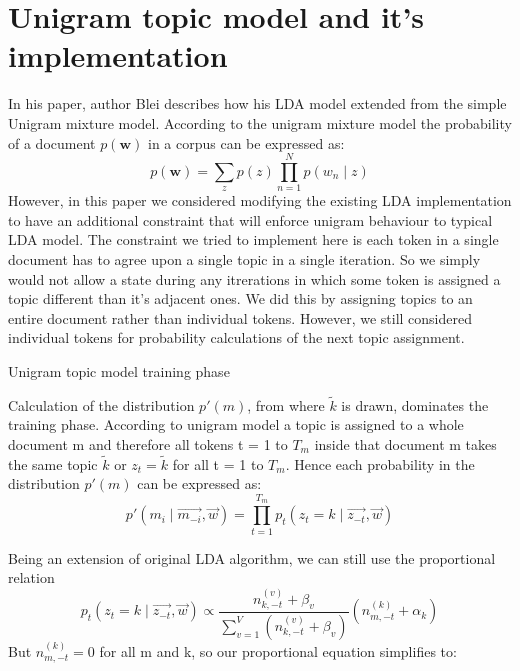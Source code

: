\section{Unigram topic model and it's implementation}
\label{sec:umm}
In his paper, author Blei describes how his LDA model extended from the simple Unigram mixture model. According to the unigram mixture model the probability of a document $p(\mathbf{w})$ in a corpus can be expressed as:
$$ p(\mathbf{w}) = \sum_z p(z) \prod_{n=1}^N p(w_n \mid z)$$
However, in this paper we considered modifying the existing LDA implementation to have an additional constraint that will enforce unigram behaviour to typical LDA model. The constraint we tried to implement here is each token in a single document has to agree upon a single topic in a single iteration. So we simply would not allow a state during any itrerations in which some token is assigned a topic different than it's adjacent ones. We did this by assigning topics to an entire document rather than individual tokens. However, we still considered individual tokens for probability calculations of the next topic assignment.
\begin{algorithm}[htp]
 \caption{Unigram topic model training phase}
\end{algorithm}
Calculation of the distribution $ p'(m)$, from where $ \widetilde{k}$ is drawn, dominates the training phase. According to unigram model a topic is assigned to a whole document m and therefore all tokens t = 1 to $ T_m$ inside that document m takes the same topic $ \widetilde{k}$ or $ z_t = \widetilde{k}$ for all t = 1 to $ T_m$. Hence each probability in the distribution $ p'(m)$ can be expressed as:
$$ p'(m_i \mid \overrightarrow{m_{-i}}, \overrightarrow{w}) =
   \prod_{t=1}^{T_m} p_t(z_t = k \mid \overrightarrow{z_{-t}}, \overrightarrow{w}) $$

Being an extension of original LDA algorithm, we can still use the proportional relation
$$ p_t(z_t = k \mid \overrightarrow{z_{-t}}, \overrightarrow{w}) \propto 
   \frac{n_{k,-t}^{(v)}+\beta_v}{\sum_{v=1}^V (n_{k,-t}^{(v)}+\beta_v)}(n_{m,-t}^{(k)}+\alpha_k)
$$
But $ n_{m,-t}^{(k)} = 0$ for all m and k, so our proportional equation simplifies to:

